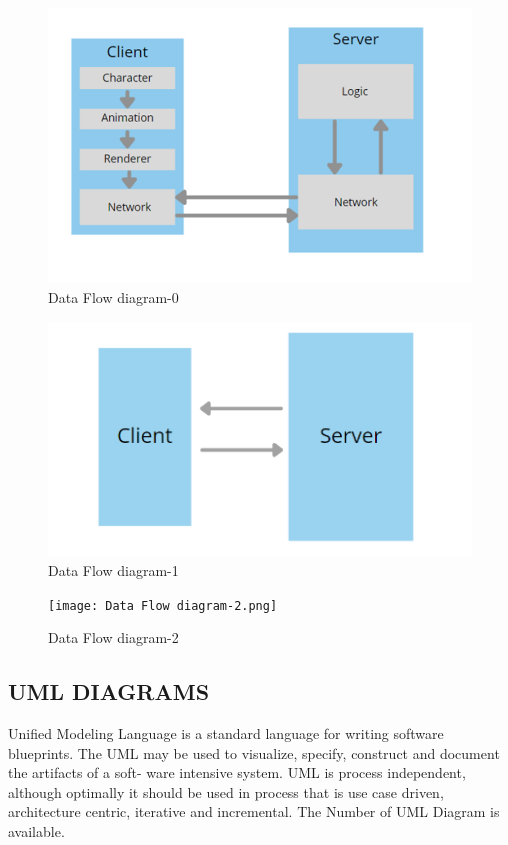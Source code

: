 \documentclass[12pt]{report}
\begin{document}
\vspace{1cm}
\begin{figure}[h]
\centering
\includegraphics[scale=0.7]{ Data Flow diagram-0.png}
\caption{ Data Flow diagram-0}
\label{ Data Flow diagram-0}
\end{figure}


\vspace{1cm}
\begin{figure}[h]
\centering
\includegraphics[scale=0.8]{ Data Flow diagram-1.png}
\caption{ Data Flow diagram-1}
\label{ Data Flow diagram-1}
\end{figure}



\vspace{1.5cm}
\begin{figure}[h]
\centering
\texttt{[image:  Data Flow diagram-2.png]}
\caption{ Data Flow diagram-2}
\label{ Data Flow diagram-2}
\end{figure}


\clearpage
\justifying
\setlength{\parindent}{4em}
\setlength{\parskip}{0.5em}
\renewcommand{\baselinestretch}{1.5}
\normalsize
\subsection{UML DIAGRAMS}
Unified Modeling Language is a standard language for writing software blueprints. The
UML may be used to visualize, specify, construct and document the artifacts of a soft- ware
intensive system. UML is process independent, although optimally it should be used in
process that is use case driven, architecture centric, iterative and incremental. The Number
of UML Diagram is available.
\end{document}
